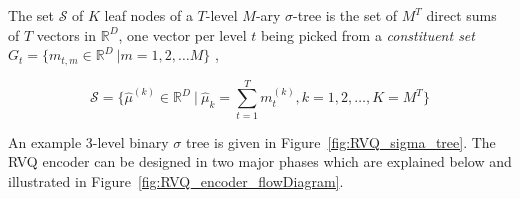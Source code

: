 The set $\mathcal{S}$ of $K$ leaf nodes of a $T$-level $M$-ary $\sigma$-tree is the set of $M^T$ direct sums of $T$ vectors in $\mathbb{R}^D$, one vector per level $t$ being picked from a \emph{constituent set} $G_t = \{m_{t,m} \in \mathbb{R}^D \ | m=1, 2, \ldots M\}$ \cite{2002_JNL_SigmaTrees_Barnes},

\begin{equation}
\mathcal{S} = \{\hat{\mu}^{(k)} \in \mathbb{R}^D \ | \ \hat{\mu}_k = \sum\limits_{t=1}^T m_t^{(k)}, k=1, 2, \ldots, K=M^T\}
\end{equation}

An example 3-level binary $\sigma$ tree is given in Figure~\ref{fig:RVQ_sigma_tree}.  The RVQ encoder can be designed in two major phases which are explained below and illustrated in Figure~\ref{fig:RVQ_encoder_flowDiagram}. 
 


 

